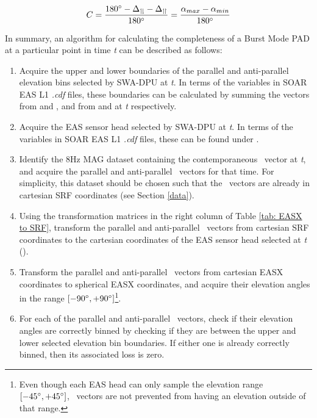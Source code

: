 \begin{equation} \label{eq: completeness}
    C=\frac{180\degree-\Delta_{\upharpoonleft \! \downharpoonright}-\Delta_{\upharpoonleft \! \upharpoonright}}{180\degree}=\frac{\alpha_{max}-\alpha_{min}}{180\degree}
\end{equation}

\newpage
In summary, an algorithm for calculating the completeness of a Burst Mode PAD at a particular point in time \textit{t} can be described as follows:
\begin{enumerate} \label{alg: C algorithm}
    \item Acquire the upper and lower boundaries of the parallel and anti-parallel elevation bins selected by SWA-DPU at \textit{t}. In terms of the variables in SOAR EAS L1 \textit{.cdf} files, these boundaries can be calculated by summing the vectors from  and ,  and from  and  at \textit{t} respectively.

    \item Acquire the EAS sensor head selected by SWA-DPU at \textit{t}. In terms of the variables in SOAR EAS L1 \textit{.cdf} files, these can be found under .
    
    \item Identify the 8Hz MAG dataset containing the contemporaneous \Bmag\ vector at \textit{t}, and acquire the parallel and anti-parallel \Bmag\ vectors for that time. For simplicity, this dataset should be chosen such that the \Bmag\ vectors are already in cartesian SRF coordinates (see Section \ref{data}).

    \item Using the transformation matrices in the right column of Table \ref{tab: EASX to SRF}, transform the parallel and anti-parallel \Bmag\ vectors from cartesian SRF coordinates to the cartesian coordinates of the EAS sensor head selected at \textit{t} ().

    \item Transform the parallel and anti-parallel \Bmag\ vectors from cartesian EASX coordinates to spherical EASX coordinates, and acquire their elevation angles in the range \([-90\degree,+90\degree]\)\footnote{Even though each EAS head can only sample the elevation range \([-45\degree,+45\degree]\), \Bmag\ vectors are not prevented from having an elevation outside of that range.}. 

    \item For each of the parallel and anti-parallel \Bmag\ vectors, check if their elevation angles are correctly binned by checking if they are between the upper and lower selected elevation bin boundaries. If either one is already correctly binned, then its associated loss is zero. 


\end{enumerate}
